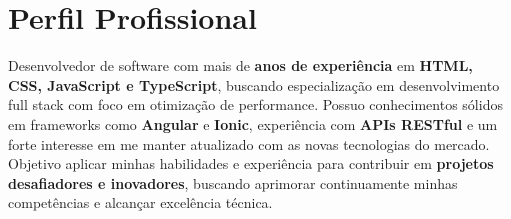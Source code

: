 \section{Perfil Profissional}

\small{
  Desenvolvedor de software com mais de \textbf{ anos de experiência} em \textbf{HTML, CSS, JavaScript e TypeScript}, buscando especialização em desenvolvimento full stack com foco em otimização de performance. Possuo conhecimentos sólidos em frameworks como \textbf{Angular} e \textbf{Ionic}, experiência com \textbf{APIs RESTful} e um forte interesse em me manter atualizado com as novas tecnologias do mercado. Objetivo aplicar minhas habilidades e experiência para contribuir em \textbf{projetos desafiadores e inovadores}, buscando aprimorar continuamente minhas competências e alcançar excelência técnica.
}